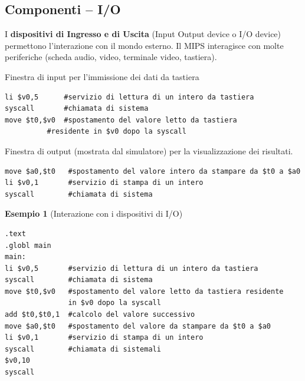 \documentclass[12pt]{article}
\begin{document}
\subsection{Componenti – I/O}
I \textbf{dispositivi di Ingresso e di Uscita} (Input Output device o I/O device) permettono l’interazione con il mondo esterno. Il MIPS interagisce con molte periferiche (scheda audio, video, terminale video, tastiera).\par\medskip\noindent
Finestra di input per l’immissione dei dati da tastiera 
\begin{lstlisting}
li $v0,5      #servizio di lettura di un intero da tastiera
syscall       #chiamata di sistema
move $t0,$v0  #spostamento del valore letto da tastiera
          #residente in $v0 dopo la syscall
\end{lstlisting}
\newpage
\noindent Finestra di output (mostrata dal simulatore) per la visualizzazione dei risultati.
\begin{lstlisting}
move $a0,$t0   #spostamento del valore intero da stampare da $t0 a $a0
li $v0,1       #servizio di stampa di un intero
syscall        #chiamata di sistema
\end{lstlisting}
\vspace{\baselineskip}
\textbf{Esempio 1} (Interazione con i dispositivi di I/O)
\begin{lstlisting}
.text
.globl main
main:
li $v0,5       #servizio di lettura di un intero da tastiera
syscall        #chiamata di sistema
move $t0,$v0   #spostamento del valore letto da tastiera residente 
               in $v0 dopo la syscall
add $t0,$t0,1  #calcolo del valore successivo
move $a0,$t0   #spostamento del valore da stampare da $t0 a $a0
li $v0,1       #servizio di stampa di un intero
syscall        #chiamata di sistemali
$v0,10
syscall
\end{lstlisting}
\vspace{\baselineskip}
\end{document}
